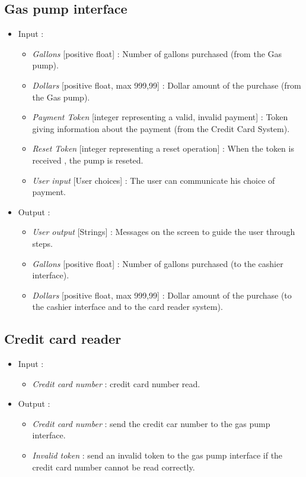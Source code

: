 \documentclass[11pt, a4paper]{article}
\newcommand{\data}[1]{\textit{#1}}
\begin{document}
\subsection{Gas pump interface}

\begin{itemize}
\item Input :
		\begin{itemize}
    \item \data{Gallons} [positive float] : Number of gallons purchased (from the Gas pump).
    \item \data{Dollars} [positive float, max 999,99] : Dollar amount of the purchase (from the Gas pump).
    \item \data{Payment Token} [integer representing a {valid, invalid} payment] : Token giving information about the payment (from the Credit Card System).
    \item \data{Reset Token} [integer representing a reset operation] : When the token is received , the pump is reseted.
    \item \data{User input} [User choices] : The user can communicate his choice of payment.
    \end{itemize}

\item Output :
		\begin{itemize}
		\item \data{User output} [Strings] : Messages on the screen to guide the user through steps.
    \item \data{Gallons} [positive float] : Number of gallons purchased (to the cashier interface).
    \item \data{Dollars} [positive float, max 999,99] : Dollar amount of the purchase (to the cashier interface and to the card reader system).
		\end{itemize}
\end{itemize}


\subsection{Credit card reader}

\begin{itemize}
\item Input :
		\begin{itemize}
		\item \data{Credit card number} : credit card number read.
		\end{itemize}

\item Output :
		\begin{itemize}
		\item \data{Credit card number} : send the credit car number to the gas pump interface.
		\item \data{Invalid token} : send an invalid token to the gas pump interface if the credit card number cannot be read correctly.
		\end{itemize}
\end{itemize}
\end{document}
